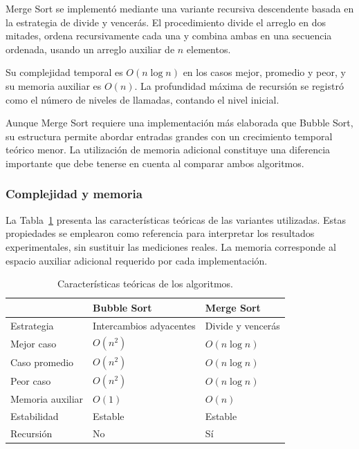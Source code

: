 \documentclass[12pt,a4paper,twocolumn]{article}
\begin{document}
Merge Sort se implementó mediante una variante recursiva
descendente basada en la estrategia de divide y vencerás. El
procedimiento divide el arreglo en dos mitades, ordena
recursivamente cada una y combina ambas en una secuencia
ordenada, usando un arreglo auxiliar de $n$ elementos.
 
Su complejidad temporal es $O(n\log n)$ en los casos mejor,
promedio y peor, y su memoria auxiliar es $O(n)$. La profundidad
máxima de recursión se registró como el número de niveles de
llamadas, contando el nivel inicial.
 
Aunque Merge Sort requiere una implementación más elaborada
que Bubble Sort, su estructura permite abordar entradas grandes
con un crecimiento temporal teórico menor. La utilización de
memoria adicional constituye una diferencia importante que
debe tenerse en cuenta al comparar ambos algoritmos.
 
\subsubsection{Complejidad y memoria}
 
La Tabla~\ref{tab:complejidad} presenta las características
teóricas de las variantes utilizadas. Estas propiedades se
emplearon como referencia para interpretar los resultados
experimentales, sin sustituir las mediciones reales. La memoria
corresponde al espacio auxiliar adicional requerido por cada
implementación.
 
\begin{table}[t]
\centering
\caption{Características teóricas de los algoritmos.}\label{tab:complejidad}
\small
\setlength{\tabcolsep}{3pt}
\begin{tabularx}{\columnwidth}{@{}>{\raggedright\arraybackslash}p{2.6cm}>{\raggedright\arraybackslash}X>{\raggedright\arraybackslash}X@{}}
\toprule
 & \textbf{Bubble Sort} & \textbf{Merge Sort} \\
\midrule
Estrategia & Intercambios adyacentes & Divide y vencerás \\
Mejor caso & $O(n^2)$ & $O(n\log n)$ \\
Caso promedio & $O(n^2)$ & $O(n\log n)$ \\
Peor caso & $O(n^2)$ & $O(n\log n)$ \\
Memoria auxiliar & $O(1)$ & $O(n)$ \\
Estabilidad & Estable & Estable \\
Recursión & No & Sí \\
\bottomrule
\end{tabularx}
\end{table}
 
\end{document}
